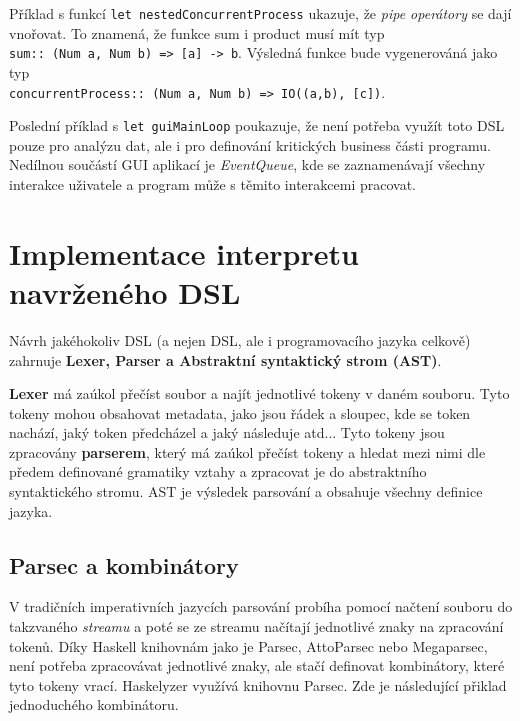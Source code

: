 \documentclass[male,czech]{kithesis}
\newcommand{\haskellInline}[1]{\colorbox{gray!10}{\texttt{#1}}}
\begin{document}
Příklad s funkcí \haskellInline{let nestedConcurrentProcess} ukazuje, 
že \textit{pipe operátory} se dají vnořovat. To znamená, že funkce sum i product musí mít typ \\
\haskellInline{sum:: (Num a, Num b) => [a] -> b}. Výsledná funkce bude vygenerováná jako typ \\
\haskellInline{concurrentProcess:: (Num a, Num b) => IO((a,b), [c])}.

Poslední příklad s \haskellInline{let guiMainLoop} poukazuje, že není potřeba využít toto DSL pouze pro analýzu dat, ale
i pro definování kritických business části programu. Nedílnou součástí GUI aplikací je \textit{EventQueue}, kde
se zaznamenávají všechny interakce uživatele a program může s těmito interakcemi pracovat.


\chapter{Implementace interpretu navrženého DSL}

Návrh jakéhokoliv DSL (a nejen DSL, ale i programovacího jazyka celkově) zahrnuje
\textbf{Lexer, Parser a Abstraktní syntaktický strom (AST)}.

\textbf{Lexer} má zaúkol přečíst soubor a najít jednotlivé tokeny v daném souboru.
Tyto tokeny mohou obsahovat metadata, jako jsou řádek a sloupec, kde se token nachází,
jaký token předcházel a jaký následuje atd... Tyto tokeny jsou zpracovány \textbf{parserem}, 
který má zaúkol přečíst tokeny a hledat mezi nimi dle předem definované gramatiky vztahy 
a zpracovat je do abstraktního syntaktického stromu. AST je výsledek
parsování a obsahuje všechny definice jazyka.

\section{Parsec a kombinátory}

V tradičních imperativních jazycích parsování probíha pomocí načtení souboru 
do takzvaného \textit{streamu} a poté se ze streamu načítají jednotlivé znaky 
na zpracování tokenů. Díky Haskell knihovnám jako je Parsec, AttoParsec nebo Megaparsec,
není potřeba zpracovávat jednotlivé znaky, ale stačí definovat kombinátory, 
které tyto tokeny vrací. Haskelyzer využívá knihovnu Parsec. Zde je následující přiklad 
jednoduchého kombinátoru.
\end{document}
